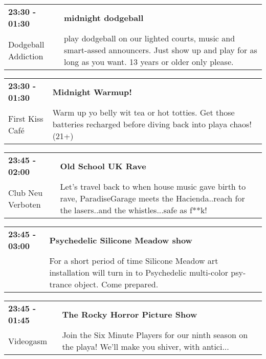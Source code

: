 \begin{tabular}{ p{1in} p{2.2in} }
    \textbf{23:30 - 01:30} & \textbf{midnight dodgeball} \\
    Dodgeball Addiction \newline  & play dodgeball on our lighted courts, music and smart-assed announcers. Just show up and play for as long as you want. 13 years or older only please. \\
    \hline 
\end{tabular}
    
\begin{tabular}{ p{1in} p{2.2in} }
    \textbf{23:30 - 01:30} & \textbf{Midnight Warmup!} \\
    First Kiss Caf\'e \newline  & Warm up yo belly wit tea or hot totties.  Get those batteries recharged before diving back into playa chaos! (21+) \\
    \hline 
\end{tabular}
    
\begin{tabular}{ p{1in} p{2.2in} }
    \textbf{23:45 - 02:00} & \textbf{Old School UK Rave } \\
    Club Neu Verboten \newline  & Let's travel back to when house music gave birth to rave, ParadiseGarage meets the Hacienda..reach for the lasers..and the whistles...safe as f**k! \\
    \hline 
\end{tabular}
    
\begin{tabular}{ p{1in} p{2.2in} }
    \textbf{23:45 - 03:00} & \textbf{Psychedelic Silicone Meadow show} \\
    ~ \newline  & For a short period of time Silicone Meadow art installation will turn in to Psychedelic multi-color psy-trance object. Come prepared. \\
    \hline 
\end{tabular}
    
\begin{tabular}{ p{1in} p{2.2in} }
    \textbf{23:45 - 01:45} & \textbf{The Rocky Horror Picture Show} \\
    Videogasm \newline  & Join the Six Minute Players for our ninth season on the playa! We'll make you shiver, with antici... \\
    \hline 
\end{tabular}
    
